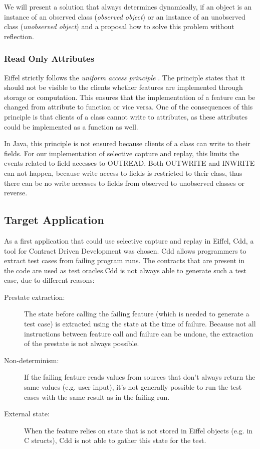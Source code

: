 We will present a solution that always determines dynamically, if an object is an instance of an observed class (\emph{observed object}) or an instance of an unobserved class (\emph{unobserved object}) and a proposal how to solve this problem without reflection.

\subsubsection{Read Only Attributes}
Eiffel strictly follows the \emph{uniform access principle} \cite{oosc2}. The principle states that it should not be visible to the clients whether features are implemented through storage or computation. This ensures that the implementation of a feature can be changed from attribute to function or vice versa. One of the consequences of this principle is that clients of a class cannot write to attributes, as these attributes could be implemented as a function as well.

In Java, this principle is not ensured because clients of a class can write to their fields. For our implementation of selective capture and replay, this limits the events related to field accesses to OUTREAD. Both OUTWRITE and INWRITE can not happen, because write access to fields is restricted to their class, thus there can be no write accesses to fields from observed to unobserved classes or reverse.

\subsection{Target Application}
As a first application that could use selective capture and replay in Eiffel, Cdd, a tool for Contract Driven Development \cite{cdd07} was chosen. Cdd allows programmers to extract test cases from failing program runs. The contracts that are present in the code are used as test oracles.Cdd is not always able to generate such a test case, due to different reasons:

\begin{description}
\item [Prestate extraction:] The state before calling the failing feature (which is needed to generate a test case) is extracted using the state at the time of failure. Because not all instructions between feature call and failure can be undone, the extraction of the prestate is not always possible.
\item [Non-determinism:] If the failing feature reads values from sources that don't always return the same values (e.g. user input), it's not generally possible to run the test cases with the same result as in the failing run.
\item [External state:] When the feature relies on state that is not stored in Eiffel objects (e.g. in C structs), Cdd is not able to gather this state for the test.
\end{description}

